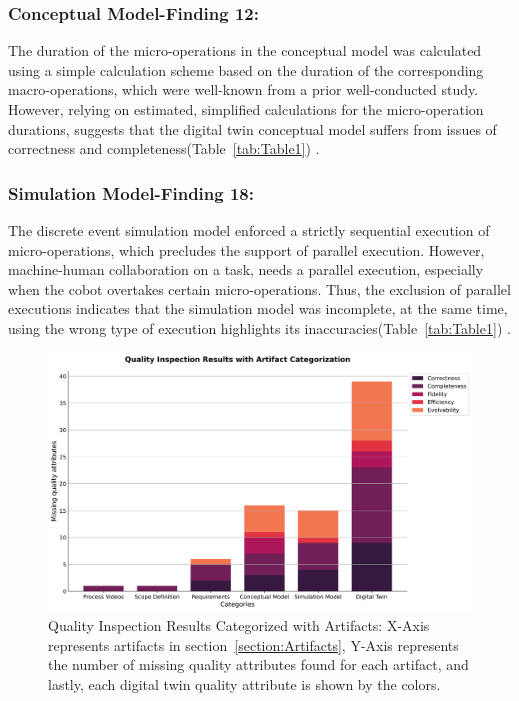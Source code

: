 \documentclass{llncs}
\begin{document}
    \subsubsection{Conceptual Model-Finding 12:}

    The duration of the micro-operations in the conceptual model was calculated using a simple calculation 
    scheme based on the duration of the corresponding macro-operations,
     which were well-known from a prior well-conducted study. 
    However, relying on estimated, 
    simplified calculations for the micro-operation durations,
    suggests that the digital twin conceptual model suffers from issues of correctness and completeness(Table~\ref{tab:Table1}) . 

    \subsubsection{Simulation Model-Finding 18:}
        The discrete event simulation model enforced a strictly sequential execution of micro-operations,
        which precludes the support of parallel execution. 
        However, machine-human collaboration on a task, needs a parallel execution, especially when the cobot overtakes certain micro-operations. 
        Thus, the exclusion of parallel executions indicates that the simulation model was incomplete,
        at the same time, using the wrong type of execution highlights its inaccuracies(Table~\ref{tab:Table1}) .
    
    \begin{figure}[htbp]
            \centering
            \includegraphics[scale = 0.35]{quality_inspection_results_with_artifacts.png}
            \caption{Quality Inspection Results Categorized with Artifacts: X-Axis represents artifacts in section~\ref{section:Artifacts}, 
            Y-Axis represents the number of missing quality attributes found for each artifact, 
            and lastly, each digital twin quality attribute is shown by the colors.}\label{fig:QualityInspectonResultsWithArtifacts}
    \end{figure}
\end{document}
